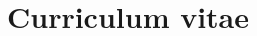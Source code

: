 \documentclass[a4paper, pagesize, DIV=15, fontsize=8pt, parskip=half, twoside, BCOR=5mm]{scrartcl}
\begin{document}
\title{Curriculum vitae}
\date{}

\maketitle

\begin{paracol}{2}

\end{paracol}
\end{document}
